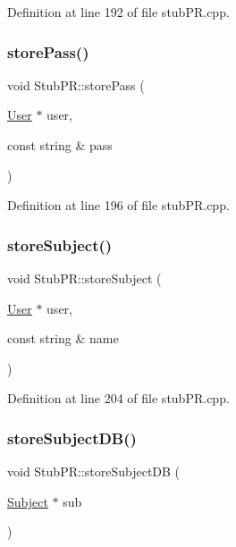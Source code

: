 Definition at line 192 of file stub\+P\+R.\+cpp.

\mbox{\label{class_stub_p_r_a1974be3ce48be29f04ba798a86d33d4b}} 
\subsubsection{\texorpdfstring{store\+Pass()}{storePass()}}
{\footnotesize\ttfamily void Stub\+P\+R\+::store\+Pass (\begin{DoxyParamCaption}\item[{\hyperlink{class_user}{User} $\ast$}]{user,  }\item[{const string \&}]{pass }\end{DoxyParamCaption})}



Definition at line 196 of file stub\+P\+R.\+cpp.

\mbox{\label{class_stub_p_r_a15dca263137dd3a1d9d107bad2053a4c}} 
\subsubsection{\texorpdfstring{store\+Subject()}{storeSubject()}}
{\footnotesize\ttfamily void Stub\+P\+R\+::store\+Subject (\begin{DoxyParamCaption}\item[{\hyperlink{class_user}{User} $\ast$}]{user,  }\item[{const string \&}]{name }\end{DoxyParamCaption})}



Definition at line 204 of file stub\+P\+R.\+cpp.

\mbox{\label{class_stub_p_r_a771618cef296522de86a06bca2a56b58}} 
\subsubsection{\texorpdfstring{store\+Subject\+D\+B()}{storeSubjectDB()}}
{\footnotesize\ttfamily void Stub\+P\+R\+::store\+Subject\+DB (\begin{DoxyParamCaption}\item[{\hyperlink{class_subject}{Subject} $\ast$}]{sub }\end{DoxyParamCaption})}



